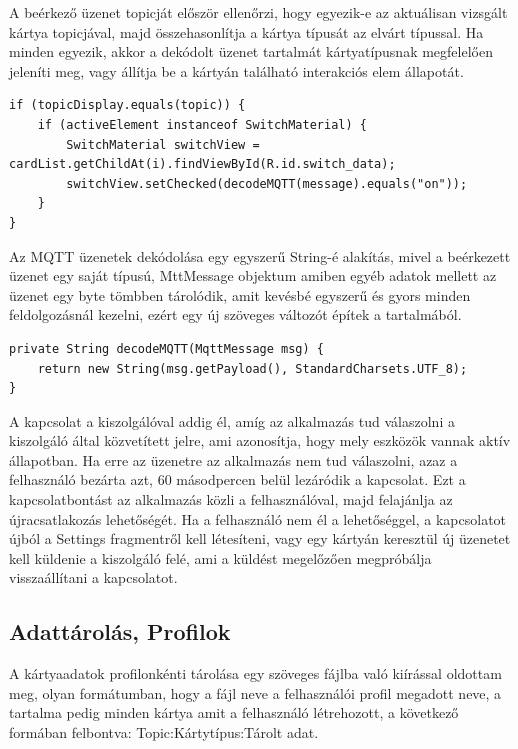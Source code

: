 \documentclass[
]{thesis-ekf}
\theoremstyle{definition}
\theoremstyle{remark}
\begin{document}
A beérkező üzenet topicját először ellenőrzi, hogy egyezik-e az aktuálisan vizsgált kártya topicjával, majd
összehasonlítja a kártya típusát az elvárt típussal. Ha minden egyezik, akkor a dekódolt üzenet tartalmát
kártyatípusnak megfelelően jeleníti meg, vagy állítja be a kártyán található interakciós elem állapotát.

\lstset{language=Java}
\begin{lstlisting}[frame=single]
if (topicDisplay.equals(topic)) {
	if (activeElement instanceof SwitchMaterial) {
		SwitchMaterial switchView = cardList.getChildAt(i).findViewById(R.id.switch_data);
		switchView.setChecked(decodeMQTT(message).equals("on"));
	}
}
\end{lstlisting}

Az MQTT üzenetek dekódolása egy egyszerű String-é alakítás, mivel a beérkezett üzenet egy saját típusú, MttMessage
objektum amiben egyéb adatok mellett az üzenet egy byte tömbben tárolódik, amit kevésbé egyszerű és gyors minden
feldolgozásnál kezelni, ezért egy új szöveges változót építek a tartalmából.

\lstset{language=Java}
\begin{lstlisting}[frame=single]
private String decodeMQTT(MqttMessage msg) {
	return new String(msg.getPayload(), StandardCharsets.UTF_8);
}

\end{lstlisting}

A kapcsolat a kiszolgálóval addig él, amíg az alkalmazás tud válaszolni a kiszolgáló által közvetített jelre,
ami azonosítja, hogy mely eszközök vannak aktív állapotban. Ha erre az üzenetre az alkalmazás nem tud válaszolni,
azaz a felhasználó bezárta azt, 60 másodpercen belül lezáródik a kapcsolat. Ezt a kapcsolatbontást az alkalmazás
közli a felhasználóval, majd felajánlja az újracsatlakozás lehetőségét. Ha a felhasználó nem él a lehetőséggel,
a kapcsolatot újból a Settings fragmentről kell létesíteni, vagy egy kártyán keresztül
új üzenetet kell küldenie a kiszolgáló felé, ami a küldést megelőzően megpróbálja visszaállítani a kapcsolatot.

\subsection{Adattárolás, Profilok}
A kártyaadatok profilonkénti tárolása egy szöveges fájlba való kiírással oldottam meg, olyan formátumban, hogy a fájl
neve a felhasználói profil megadott neve, a tartalma pedig minden kártya amit a felhasználó létrehozott, a következő
formában felbontva: Topic:Kártytípus:Tárolt adat.
\end{document}
